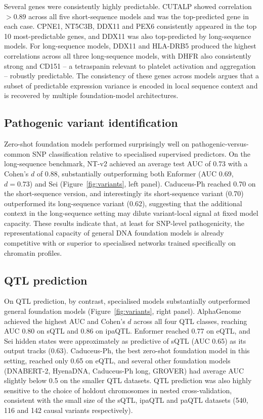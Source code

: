 \documentclass[11pt,a4paper]{article}
\begin{document}
Several genes were consistently highly predictable. CUTALP showed correlation $> 0.89$ across all five short-sequence models and was the top-predicted gene in each case. CPNE1, NT5C3B, DDX11 and PEX6 consistently appeared in the top 10 most-predictable genes, and DDX11 was also top-predicted by long-sequence models. For long-sequence models, DDX11 and HLA-DRB5 produced the highest correlations across all three long-sequence models, with DHFR also consistently strong and CD151 -- a tetraspanin relevant to platelet activation and aggregation -- robustly predictable. The consistency of these genes across models argues that a subset of predictable expression variance is encoded in local sequence context and is recovered by multiple foundation-model architectures.

\subsection{Pathogenic variant identification}
Zero-shot foundation models performed surprisingly well on pathogenic-versus-common SNP classification relative to specialised supervised predictors. On the long-sequence benchmark, NT-v2 achieved an average test AUC of 0.73 with a Cohen's $d$ of 0.88, substantially outperforming both Enformer (AUC 0.69, $d = 0.73$) and Sei (Figure~\ref{fig:variants}, left panel). Caduceus-Ph reached 0.70 on the short-sequence version, and interestingly its short-sequence variant (0.70) outperformed its long-sequence variant (0.62), suggesting that the additional context in the long-sequence setting may dilute variant-local signal at fixed model capacity. These results indicate that, at least for SNP-level pathogenicity, the representational capacity of general DNA foundation models is already competitive with or superior to specialised networks trained specifically on chromatin profiles.

\subsection{QTL prediction}
On QTL prediction, by contrast, specialised models substantially outperformed general foundation models (Figure~\ref{fig:variants}, right panel). AlphaGenome achieved the highest AUC and Cohen's $d$ across all four QTL classes, reaching AUC 0.80 on sQTL and 0.86 on ipaQTL. Enformer reached 0.77 on eQTL, and Sei hidden states were approximately as predictive of sQTL (AUC 0.65) as its output tracks (0.63). Caduceus-Ph, the best zero-shot foundation model in this setting, reached only 0.65 on eQTL, and several other foundation models (DNABERT-2, HyenaDNA, Caduceus-Ph long, GROVER) had average AUC slightly below 0.5 on the smaller QTL datasets. QTL prediction was also highly sensitive to the choice of holdout chromosomes in nested cross-validation, consistent with the small size of the sQTL, ipaQTL and paQTL datasets (540, 116 and 142 causal variants respectively).
\end{document}
